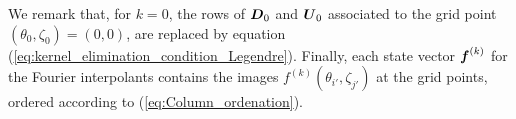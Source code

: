 We remark that, for $k=0$, the rows of $\vb*{D}_0$ and $\vb*{U}_0$ associated to the grid point $(\theta_0,\zeta_0)=(0,0)$, are replaced by equation (\ref{eq:kernel_elimination_condition_Legendre}). Finally, each state vector $\vb*{f}^{(k)}$ for the Fourier interpolants contains the images $f^{(k)}(\theta_{i'},\zeta_{j'})$ at the grid points, ordered according to (\ref{eq:Column_ordenation}).

